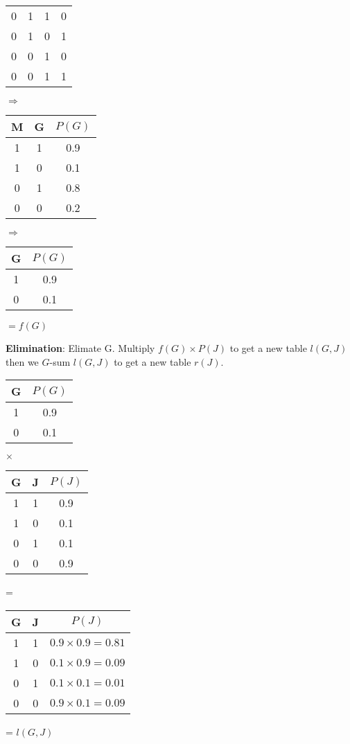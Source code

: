 \documentclass{article}
\begin{document}
\begin{center}
\begin{tabular}{ |c c c|c| }
	 0 & 1 & 1 & 0 \\
	 0 & 1 & 0 & 1 \\

	 0 & 0 & 1 & 0 \\
	 0 & 0 & 1 & 1 \\
	 \hline
	\end{tabular}
	$\Rightarrow$
	\begin{tabular}{ |c c|c| }
	 \hline
	 M & G & $P(G)$ \\
	 \hline
	 1 & 1 & 0.9 \\
	 1 & 0 & 0.1 \\

	 0 & 1 & 0.8 \\
	 0 & 0 & 0.2 \\
	 \hline
	\end{tabular}
\end{center}
\begin{center}
	$\Rightarrow$
	\begin{tabular}{ |c|c| }
	 \hline
	 G & $P(G)$ \\
	 \hline
	 1 & 0.9 \\
	 0 & 0.1 \\
	 \hline
	\end{tabular}
	$= f(G)$
\end{center}
\textbf{Elimination}: Elimate G. Multiply $f(G) \times P(J)$ to get a new table $l(G,J)$ then we $G$-sum $l(G,J)$ to get a new table $r(J)$.
\begin{center}
	\begin{tabular}{ |c|c| }
	 \hline
	 G & $P(G)$ \\
	 \hline
	 1 & 0.9 \\
	 0 & 0.1 \\
	 \hline
	\end{tabular}
	$\times$
	\begin{tabular}{ |c|c|c| }
	 \hline
	 G & J & $P(J)$ \\
	 \hline
	 1 & 1 & 0.9 \\
	 1 & 0 & 0.1 \\
	 0 & 1 & 0.1 \\
	 0 & 0 & 0.9 \\
	 \hline
	\end{tabular}
	=
	\begin{tabular}{ |c|c|c| }
	 \hline
	 G & J & $P(J)$ \\
	 \hline
	 1 & 1 & $0.9 \times 0.9 = 0.81$ \\
	 1 & 0 & $0.1 \times 0.9 = 0.09$ \\
	 0 & 1 & $0.1 \times 0.1 = 0.01$ \\
	 0 & 0 & $0.9 \times 0.1 = 0.09$ \\
	 \hline
	\end{tabular}
	= $l(G,J)$
\end{center}
\end{document}
